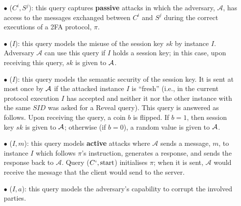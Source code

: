 \begin{itemize}
%
\item [$\bullet$] \execute($C^{i}, S^{j}$): this query captures \textbf{passive} attacks in which the adversary, $\mathcal{A}$, has access to the messages exchanged between $C^{i}$ and $S^{j}$ during the correct executions of a 2FA protocol, $\pi$. 



\item [$\bullet$] \reveal($I$): this query models the misuse of the session key $sk$ by instance $I$.  Adversary $\mathcal{A}$ can use this query if $I$ holds a session key; in this case, upon receiving this query, $sk$ is given to $\mathcal{A}$. 
%



\item [$\bullet$] \test($I$): this query models the semantic security of the session key. It is sent at most once by $\mathcal{A}$ if the attacked instance $I$  is ``fresh'' (i.e., in the current protocol execution $I$ has accepted and neither it nor the other instance with the same $SID$ was asked for a Reveal query). This query is answered as follows. Upon receiving the query, a coin $b$ is flipped. If $b=1$, then session key $sk$ is given to $\mathcal{A}$; otherwise (if $b=0$), a random value is given to $\mathcal{A}$. 



\item [$\bullet$] \send($I, m$):  this query models \textbf{active} attacks where $\mathcal{A}$ sends a message, $m$, to instance $I$ which follows  $\pi$'s instruction, generates a response, and sends the response back to $\mathcal{A}$.  Query  \send($C^{\scriptscriptstyle i}, \text{start}$) initialises $\pi$; when it is sent, $\mathcal{A}$ would receive the message that the client would send to the server. 

%



%
\item [$\bullet$]  \corrupt($I, a$): this query models the adversary's capability to corrupt the involved parties. 




\end{itemize}
